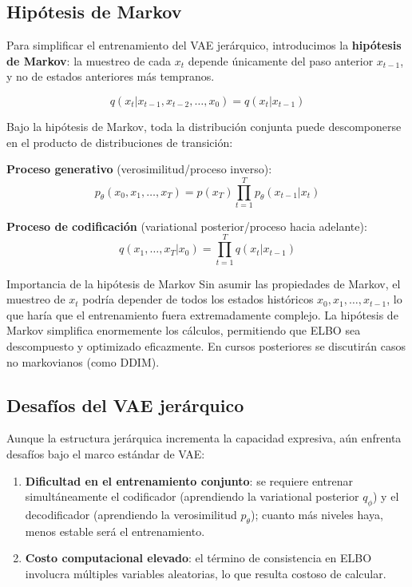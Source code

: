\subsection{Hipótesis de Markov}

Para simplificar el entrenamiento del VAE jerárquico, introducimos la \textbf{hipótesis de Markov}: la muestreo de cada $x_t$ depende únicamente del paso anterior $x_{t-1}$, y no de estados anteriores más tempranos.

$$q(x_t | x_{t-1}, x_{t-2}, \ldots, x_0) = q(x_t | x_{t-1})$$

Bajo la hipótesis de Markov, toda la distribución conjunta puede descomponerse en el producto de distribuciones de transición:

\textbf{Proceso generativo} (verosimilitud/proceso inverso):
$$p_\theta(x_0, x_1, \ldots, x_T) = p(x_T) \prod_{t=1}^{T} p_\theta(x_{t-1} | x_t)$$

\textbf{Proceso de codificación} (variational posterior/proceso hacia adelante):
$$q(x_1, \ldots, x_T | x_0) = \prod_{t=1}^{T} q(x_t | x_{t-1})$$

\begin{importantbox}{Importancia de la hipótesis de Markov}
Sin asumir las propiedades de Markov, el muestreo de $x_t$ podría depender de todos los estados históricos $x_0, x_1, \ldots, x_{t-1}$, lo que haría que el entrenamiento fuera extremadamente complejo. La hipótesis de Markov simplifica enormemente los cálculos, permitiendo que ELBO sea descompuesto y optimizado eficazmente. En cursos posteriores se discutirán casos no markovianos (como DDIM).
\end{importantbox}

\subsection{Desafíos del VAE jerárquico}

Aunque la estructura jerárquica incrementa la capacidad expresiva, aún enfrenta desafíos bajo el marco estándar de VAE:

\begin{enumerate}
    \item \textbf{Dificultad en el entrenamiento conjunto}: se requiere entrenar simultáneamente el codificador (aprendiendo la variational posterior $q_\phi$) y el decodificador (aprendiendo la verosimilitud $p_\theta$); cuanto más niveles haya, menos estable será el entrenamiento.
    \item \textbf{Costo computacional elevado}: el término de consistencia en ELBO involucra múltiples variables aleatorias, lo que resulta costoso de calcular.
\end{enumerate}

